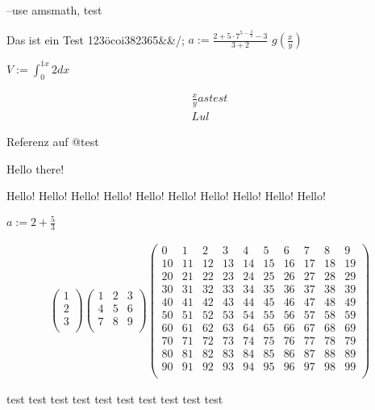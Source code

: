 % 
%
--use amsmath, test


\test{}



Das ist ein Test 123öcoi382365&&/;
$a:=\frac{2+5 \cdot{} 7^{5-\frac{3}{2}}-3}{3+2}$
$g\left(\frac{x}{y}\right)$

$V := \int_{0}^{1 x}2dx$

\begin{align}
    \frac{x}{y} as test\\
    Lul
\end{align}

Referenz auf @test

Hello there!

Hello!
Hello!
Hello!
Hello!
Hello!
Hello!
Hello!
Hello!
Hello!
Hello!


$a:=2+\frac{5}{3}$

\begin{align}
    \begin{pmatrix}
1\\
2\\
3\\
\end{pmatrix}
\begin{pmatrix}
1 & 2 & 3\\
4 & 5 & 6\\
7 & 8 & 9\\
\end{pmatrix}
\begin{pmatrix}
0 & 1 & 2 & 3 & 4 & 5 & 6 & 7 & 8 & 9\\
10 & 11 & 12 & 13 & 14 & 15 & 16 & 17 & 18 & 19\\
20 & 21 & 22 & 23 & 24 & 25 & 26 & 27 & 28 & 29\\
30 & 31 & 32 & 33 & 34 & 35 & 36 & 37 & 38 & 39\\
40 & 41 & 42 & 43 & 44 & 45 & 46 & 47 & 48 & 49\\
50 & 51 & 52 & 53 & 54 & 55 & 56 & 57 & 58 & 59\\
60 & 61 & 62 & 63 & 64 & 65 & 66 & 67 & 68 & 69\\
70 & 71 & 72 & 73 & 74 & 75 & 76 & 77 & 78 & 79\\
80 & 81 & 82 & 83 & 84 & 85 & 86 & 87 & 88 & 89\\
90 & 91 & 92 & 93 & 94 & 95 & 96 & 97 & 98 & 99\\
\end{pmatrix}

\end{align}





test
test
test
test
test
test
test
test
test
test


%
%
%
%
%
%
%
%
%
%
%